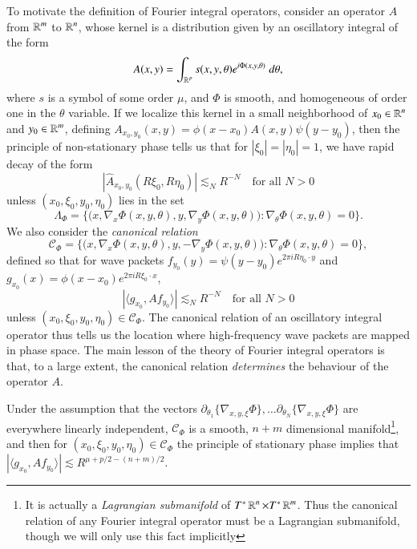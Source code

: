To motivate the definition of Fourier integral operators, consider an operator $A$ from $\operatorname{\mathbb{R}}^m$ to $\operatorname{\mathbb{R}}^n$, whose kernel is a distribution given by an oscillatory integral of the form
%
\[ A(x,y) = \int_{\operatorname{\mathbb{R}}^p} s(x,y,\theta) e^{i \Phi(x,y,\theta)}\; d\theta, \]
%
where $s$ is a symbol of some order $\mu$, and $\Phi$ is smooth, and homogeneous of order one in the $\theta$ variable. If we localize this kernel in a small neighborhood of $x_0 \in \operatorname{\mathbb{R}}^n$ and $y_0 \in \operatorname{\mathbb{R}}^m$, defining $A_{x_0,y_0}(x,y) = \phi(x - x_0) A(x,y) \psi(y - y_0)$, then the principle of non-stationary phase tells us that for $|\xi_0| = |\eta_0| = 1$, we have rapid decay of the form
%
\[ |\widehat{A}_{x_0,y_0}(R\xi_0,R\eta_0)| \lesssim_N R^{-N}\quad \text{for all $N > 0$} \]
%
unless $(x_0,\xi_0,y_0,\eta_0)$ lies in the set
%
\[ \Lambda_\Phi = \Big\{ \big(x, \nabla_x \Phi(x,y,\theta) ,y, \nabla_y \Phi(x,y,\theta) \big) : \nabla_\theta \Phi(x,y,\theta) = 0 \Big\}. \]
%
We also consider the \emph{canonical relation}
%
\[ \mathcal{C}_\Phi = \Big\{ \big(x, \nabla_x \Phi(x,y,\theta) ,y, -\nabla_y \Phi(x,y,\theta) \big) : \nabla_\theta \Phi(x,y,\theta) = 0 \Big\}, \]
%
defined so that for wave packets $f_{y_0}(y) = \psi(y - y_0) e^{2 \pi i R \eta_0 \cdot y}$ and $g_{x_0}(x) = \phi(x - x_0) e^{2 \pi i R \xi_0 \cdot x}$,
%
\[ |\langle g_{x_0}, Af_{y_0} \rangle| \lesssim_N R^{-N}\quad \text{for all $N > 0$} \]
%
unless $(x_0,\xi_0,y_0,\eta_0) \in \mathcal{C}_\Phi$. The canonical relation of an oscillatory integral operator thus tells us the location where high-frequency wave packets are mapped in phase space. The main lesson of the theory of Fourier integral operators is that, to a large extent, the canonical relation \emph{determines} the behaviour of the operator $A$.

Under the assumption that the vectors $\partial_{\theta_1} \{ \nabla_{x,y,\xi} \Phi \}, \dots \partial_{\theta_N} \{ \nabla_{x,y,\xi} \Phi \}$ are everywhere linearly independent, $\mathcal{C}_\Phi$ is a smooth, $n + m$ dimensional manifold\footnote{It is actually a \emph{Lagrangian submanifold} of $T^* \operatorname{\mathbb{R}}^n \times T^* \operatorname{\mathbb{R}}^m$. Thus the canonical relation of any Fourier integral operator must be a Lagrangian submanifold, though we will only use this fact implicitly}, and then for $(x_0,\xi_0,y_0,\eta_0) \in \mathcal{C}_\Phi$ the principle of stationary phase implies that $|\langle g_{x_0}, Af_{y_0} \rangle| \lesssim R^{\mu + p/2 - (n+m)/2}$.



